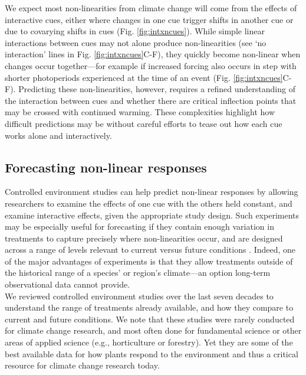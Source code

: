 \documentclass[11pt,letter]{article}
\begin{document}
We expect most non-linearities from climate change will come from the effects of interactive cues, either where changes in one cue trigger shifts in another cue or due to covarying shifts in cues (Fig. \ref{fig:intxncues}). While simple linear interactions between cues may not alone produce non-linearities (see `no interaction' lines in Fig. \ref{fig:intxncues}C-F), they quickly become non-linear when changes occur together---for example if increased forcing also occurs in step with shorter photoperiods experienced at the time of an event (Fig. \ref{fig:intxncues}C-F). Predicting these non-linearities, however, requires a refined understanding of the interaction between cues and whether there are critical inflection points that may be crossed with continued warming. These complexities highlight how difficult predictions may be without careful efforts to tease out how each cue works alone and interactively. \\ 

\subsection{Forecasting non-linear responses} %
Controlled environment studies can help predict non-linear responses by allowing researchers to examine the effects of one cue with the others held constant, and examine interactive effects, given the appropriate study design. Such experiments may be especially useful for forecasting if they contain enough variation in treatments to capture precisely where non-linearities occur, and are designed across a range of levels relevant to current versus future conditions \citep{shen2015}. Indeed, one of the major advantages of experiments is that they allow treatments outside of the historical range of a species' or region's climate---an option long-term observational data cannot provide. \\

We reviewed controlled environment studies over the last seven decades to understand the range of treatments already available, and how they compare to current and future conditions. We note that these studies were rarely conducted for climate change research, and most often done for fundamental science or other areas of applied science (e.g., horticulture or forestry). Yet they are some of the best available data for how plants respond to the environment and thus a critical resource for climate change research today.\\
\end{document}

